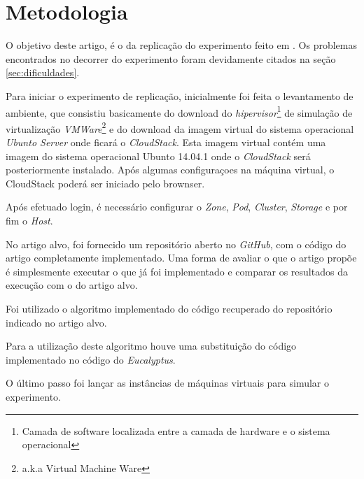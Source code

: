 \section{Metodologia}

O objetivo deste artigo, é o da replicação do experimento feito em \cite{coutinho_et_al:14}. Os problemas encontrados no decorrer do experimento foram devidamente citados na seção \ref{sec:dificuldades}.

Para iniciar o experimento de replicação, inicialmente foi feita o levantamento de ambiente, que consistiu basicamente do download do \textit{hipervisor}\footnote{Camada de software localizada entre a camada de hardware e o sistema operacional\cite{dev_midia}} de simulação de virtualização \textit{VMWare}\footnote{a.k.a Virtual Machine Ware} e do download da imagem virtual do sistema operacional \textit{Ubunto Server} onde ficará o \textit{CloudStack}. Esta imagem virtual contém uma imagem do sistema operacional Ubunto 14.04.1 onde o \textit{CloudStack} será posteriormente instalado. Após algumas configuraçoes na máquina virtual, o CloudStack poderá ser iniciado pelo brownser. 

Após efetuado login, é necessário configurar o \textit{Zone}, \textit{Pod}, \textit{Cluster}, \textit{Storage} e por fim o \textit{Host}.

No artigo alvo, foi fornecido um repositório aberto no \textit{GitHub}, com o código do artigo completamente implementado. Uma forma de avaliar o que o artigo propõe é simplesmente executar o que já foi implementado e comparar os resultados da execução com o do artigo alvo.

Foi utilizado o algoritmo implementado do código recuperado do repositório indicado no artigo alvo.

Para a utilização deste algoritmo houve uma substituição do código implementado no código do \textit{Eucalyptus}.

O último passo foi lançar as instâncias de máquinas virtuais para simular o experimento. 
